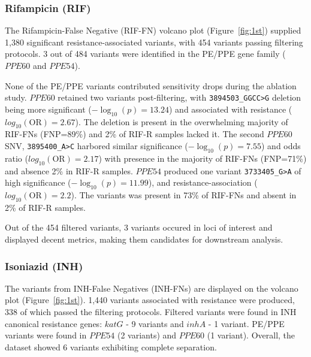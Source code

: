 \subsubsection{Rifampicin (RIF)}
The Rifampicin-False Negative (RIF-FN) volcano plot (Figure~\ref{fig:1st}) supplied 1,380 significant resistance-associated variants, with 454 variants passing filtering protocols. 3 out of 484 variants were identified in the PE/PPE gene family ($PPE60$ and $PPE54$).
 
None of the PE/PPE variants contributed sensitivity drops during the ablation study. $PPE60$ retained two variants post-filtering, with \texttt{3894503\_GGCC>G} deletion being more significant ($-\log_{10}(p)=13.24$) and associated with resistance ($log_{10}(\text{OR})=2.67$). The deletion is present in the overwhelming majority of RIF-FNs (FNP=89\%) and 2\% of RIF-R samples lacked it. The second $PPE60$ SNV, \texttt{3895400\_A>C} harbored similar significance ($-\log_{10}(p)=7.55$) and odds ratio ($log_{10}(\text{OR})=2.17$) with presence in the majority of RIF-FNs (FNP=71\%) and absence 2\% in RIF-R samples. $PPE54$ produced one variant \texttt{3733405\_G>A} of high significance ($-\log_{10}(p)=11.99$), and resistance-association ($log_{10}(\text{OR})=2.2$). The variants was present in 73\% of RIF-FNs and absent in 2\% of RIF-R samples.

Out of the 454 filtered variants, 3 variants occured in loci of interest and displayed decent metrics, making them candidates for downstream analysis. 

\subsubsection{Isoniazid (INH)}
The variants from INH-False Negatives (INH-FNs) are displayed on the volcano plot (Figure~\ref{fig:1st}). 1,440 variants associated with resistance were produced, 338 of which passed the filtering protocols. Filtered variants were found in INH canonical resistance genes: $katG$ - 9 variants and $inhA$ - 1 variant. PE/PPE variants were found in $PPE54$ (2 variants) and $PPE60$ (1 variant). Overall, the dataset showed 6 variants exhibiting complete separation.  

